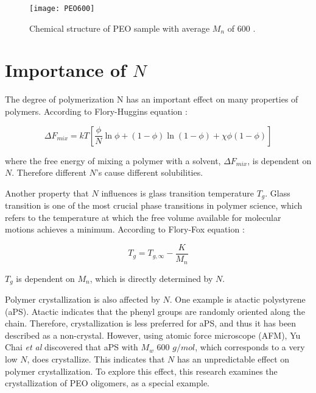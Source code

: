 \begin{figure}[H]
	\center
	\texttt{[image: PEO600]}
	\caption[Chemical structure of PEO sample with average $M_{n}$ of 600.]{Chemical structure of PEO sample with average $M_{n}$ of 600 \cite{Sigma-Aldrich2018}.}
	\label{fig:PEO600}
\end{figure}

\section{Importance of $N$}

The degree of polymerization N has an important effect on many properties of polymers. According to Flory-Huggins equation \cite{Rubinstein2003}: 

\begin{equation}
\label{eqn_free energy}
\Delta F_{mix} = kT [\dfrac{\phi}{N} \ln \phi + (1 - \phi) \ln (1 - \phi) + \chi \phi (1 - \phi)]
\end{equation}

\noindent
where the free energy of mixing a polymer with a solvent, $\Delta F_{mix}$, is dependent on $N$. Therefore different $N$'s cause different solubilities. 

Another property that $N$ influences is glass transition temperature $T_{g}$. Glass transition is one of the most crucial phase transitions in polymer science, which refers to the temperature at which the free volume available for molecular motions achieves a minimum. According to Flory-Fox equation \cite{Fox1950a}:

\begin{equation}
\label{eqn_fox-flory}
T_{g} = T_{g,\infty} - \dfrac{K}{M_{n}}
\end{equation}

\noindent
$T_{g}$ is dependent on $M_{n}$, which is directly determined by $N$.

Polymer crystallization is also affected by $N$. One example is atactic polystyrene (aPS). Atactic indicates that the phenyl groups are randomly oriented along the chain. Therefore, crystallization is less preferred for aPS, and thus it has been described as a non-crystal. However, using atomic force microscope (AFM), Yu Chai \textit{et al} \cite{Chai2016} discovered that aPS with $M_{w}$ 600 $g/mol$, which corresponds to a very low $N$, does crystallize. This indicates that $N$ has an unpredictable effect on polymer crystallization. To explore this effect, this research examines the crystallization of PEO oligomers, as a special example.


